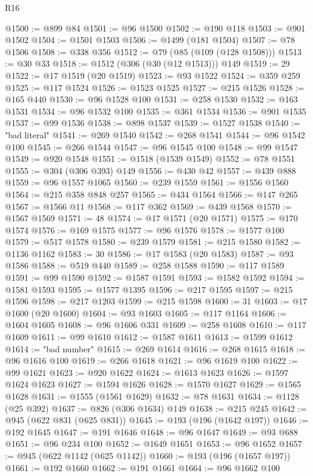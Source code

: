 \begin{lexlean}{R16}
\begin{coremodule}
@1500 := @899 @84
@1501 := @96 @1500
@1502 := @190 @118
@1503 := @901 @1502
@1504 := @1501 @1503
@1506 := @1499 (@181 @1504)
@1507 := @78 @1506
@1508 := @338 @356
@1512 := @79 (@85 (@109 (@128 @1508)))
@1513 := @30 @33
@1518 := @1512 (@306 (@30 (@12 @1513))) @149
@1519 := 29
@1522 := @17 @1519 (@20 @1519)
@1523 := @93 @1522
@1524 := @359 @259
@1525 := @117 @1524
@1526 := @1523 @1525
@1527 := @215 @1526
@1528 := @165 @440
@1530 := @96 @1528 @100
@1531 := @258 @1530
@1532 := @163 @1531
@1534 := @96 @1532 @100
@1535 := @361 @1534
@1536 := @901 @1535
@1537 := @99 @1536
@1538 := @898 @1537
@1539 := @1527 @1538
@1540 := "bad literal"
@1541 := @269 @1540
@1542 := @268 @1541
@1544 := @96 @1542 @100
@1545 := @266 @1544
@1547 := @96 @1545 @100
@1548 := @99 @1547
@1549 := @920 @1548
@1551 := @1518 (@1539 @1549)
@1552 := @78 @1551
@1555 := @304 (@306 @393) @149
@1556 := @430 @42
@1557 := @439 @888
@1559 := @96 @1557 @1065
@1560 := @239 @1559
@1561 := @1556 @1560
@1564 := @215 @358 @848 @257
@1565 := @434 @1564
@1566 := @147 @265
@1567 := @1566 @11
@1568 := @117 @362
@1569 := @439 @1568
@1570 := @1567 @1569
@1571 := 48
@1574 := @17 @1571 (@20 @1571)
@1575 := @170 @1574
@1576 := @169 @1575
@1577 := @96 @1576
@1578 := @1577 @100
@1579 := @517 @1578
@1580 := @239 @1579
@1581 := @215 @1580
@1582 := @1136 @1162
@1583 := 30
@1586 := @17 @1583 (@20 @1583)
@1587 := @93 @1586
@1588 := @519 @440
@1589 := @258 @1588
@1590 := @117 @1589
@1591 := @99 @1590
@1592 := @1587 @1591
@1593 := @1582 @1592
@1594 := @1581 @1593
@1595 := @1577 @1395
@1596 := @217 @1595
@1597 := @215 @1596
@1598 := @217 @1203
@1599 := @215 @1598
@1600 := 31
@1603 := @17 @1600 (@20 @1600)
@1604 := @93 @1603
@1605 := @117 @1164
@1606 := @1604 @1605
@1608 := @96 @1606 @331
@1609 := @258 @1608
@1610 := @117 @1609
@1611 := @99 @1610
@1612 := @1587 @1611
@1613 := @1599 @1612
@1614 := "bad number"
@1615 := @269 @1614
@1616 := @268 @1615
@1618 := @96 @1616 @100
@1619 := @266 @1618
@1621 := @96 @1619 @100
@1622 := @99 @1621
@1623 := @920 @1622
@1624 := @1613 @1623
@1626 := @1597 @1624 @1623
@1627 := @1594 @1626
@1628 := @1570 @1627
@1629 := @1565 @1628
@1631 := @1555 (@1561 @1629)
@1632 := @78 @1631
@1634 := @1128 (@25 @392)
@1637 := @826 (@306 @1634) @149
@1638 := @215 @245
@1642 := @945 (@622 @831 (@625 @831))
@1645 := @193 (@196 (@1642 @197))
@1646 := @192 @1645
@1647 := @191 @1646
@1648 := @96 @1647
@1649 := @93 @688
@1651 := @96 @234 @100
@1652 := @1649 @1651
@1653 := @96 @1652
@1657 := @945 (@622 @1142 (@625 @1142))
@1660 := @193 (@196 (@1657 @197))
@1661 := @192 @1660
@1662 := @191 @1661
@1664 := @96 @1662 @100

\end{coremodule}
\end{lexlean}
